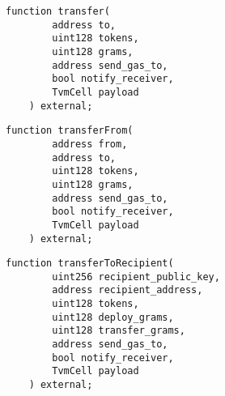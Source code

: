 \begin{lstlisting}[firstnumber=33]
    function transfer(
        address to,
        uint128 tokens,
        uint128 grams,
        address send_gas_to,
        bool notify_receiver,
        TvmCell payload
    ) external;
\end{lstlisting}
\vspace{2cm}

\begin{lstlisting}[firstnumber=42]
    function transferFrom(
        address from,
        address to,
        uint128 tokens,
        uint128 grams,
        address send_gas_to,
        bool notify_receiver,
        TvmCell payload
    ) external;
\end{lstlisting}
\vspace{2cm}

\begin{lstlisting}[firstnumber=52]
    function transferToRecipient(
        uint256 recipient_public_key,
        address recipient_address,
        uint128 tokens,
        uint128 deploy_grams,
        uint128 transfer_grams,
        address send_gas_to,
        bool notify_receiver,
        TvmCell payload
    ) external;
\end{lstlisting}
